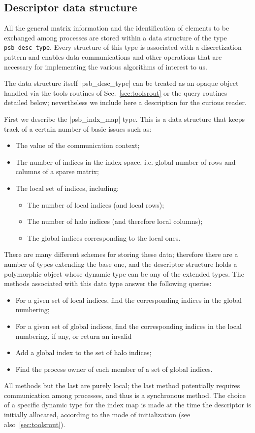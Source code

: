 \subsection{Descriptor data structure}
\label{sec:desc}
All the general matrix information and the identification of elements
to be exchanged among processes are stored within a data structure of
the type \hypertarget{descdata}{{\tt psb\_desc\_type}}. 
Every structure of this type is associated with a discretization
pattern and enables data communications and other operations that are
necessary for implementing the various algorithms of interest to us. 

The data structure itself \fortinline|psb_desc_type| can be treated as an
opaque object handled via the   tools routines of
Sec.~\ref{sec:toolsrout} or the query routines detailed below;
nevertheless we include here a  description for the curious 
reader. 

First we describe the \fortinline|psb_indx_map| type. This is a data
structure that keeps track of a certain number of basic issues such
as:
\begin{itemize}
\item The value of the communication context;
\item The number of indices in the index space, i.e. global number of
  rows and columns of a sparse matrix;
\item The local set of indices, including:
\begin{itemize}
\item The number of local indices (and local rows);
\item The number of halo indices (and therefore local columns); 
\item The global indices corresponding to the local ones. 
\end{itemize}
\end{itemize}
There are many different schemes for storing these data; therefore
there are a number of types extending the base one, and the descriptor
structure holds a polymorphic object whose dynamic type can be any of
the extended  types. 
The methods associated with this data type answer the following
queries:
\begin{itemize}
\item For a given set of local indices, find the corresponding indices
  in the global numbering;
\item For a given set of global indices, find the corresponding
  indices in the local numbering, if any, or return an invalid 
\item Add a global index to the set of halo indices;
\item Find the process  owner of each member of a set of global
  indices.
\end{itemize}
All methods but the last are purely local; the last method potentially
requires communication among processes, and thus is a synchronous
method. The choice of a specific dynamic type for the index map is
made at the time the descriptor is initially allocated, according to
the mode of initialization (see also~\ref{sec:toolsrout}).


